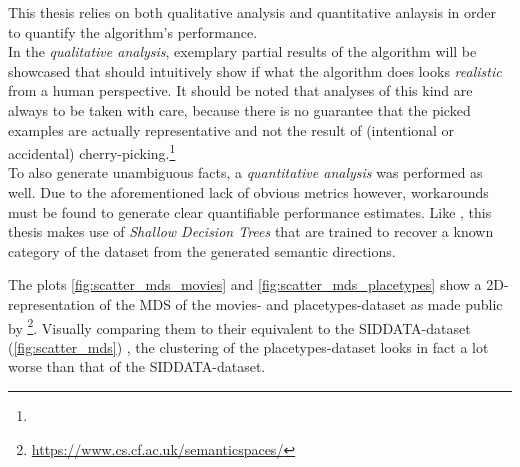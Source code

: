 This thesis relies on both qualitative analysis and quantitative anlaysis in order to quantify the algorithm's performance.\\ 
In the \textit{qualitative analysis}, exemplary partial results of the algorithm will be showcased that should intuitively show if what the algorithm does looks \textit{realistic} from a human perspective. It should be noted that analyses of this kind are always to be taken with care, because there is no guarantee that the picked examples are actually representative and not the result of (intentional or accidental) cherry-picking.\footnote{}\\
To also generate unambiguous facts, a \textit{quantitative analysis} was performed as well. Due to the aforementioned lack of obvious metrics however, workarounds must be found to generate clear quantifiable performance estimates. Like \mainalgos, this thesis makes use of \textit{Shallow Decision Trees} that are trained to recover a known category of the dataset from the generated semantic directions.


The plots \ref{fig:scatter_mds_movies} and \ref{fig:scatter_mds_placetypes} show a 2D-representation of the MDS %
of the movies- and placetypes-dataset as made public by \textcite{Derrac2015}\footnote{\url{https://www.cs.cf.ac.uk/semanticspaces/}}. Visually comparing them to their equivalent to the SIDDATA-dataset (\autoref{fig:scatter_mds}) , the clustering of the placetypes-dataset looks in fact a lot worse than that of the SIDDATA-dataset.

\begin{table}
\end{table}


